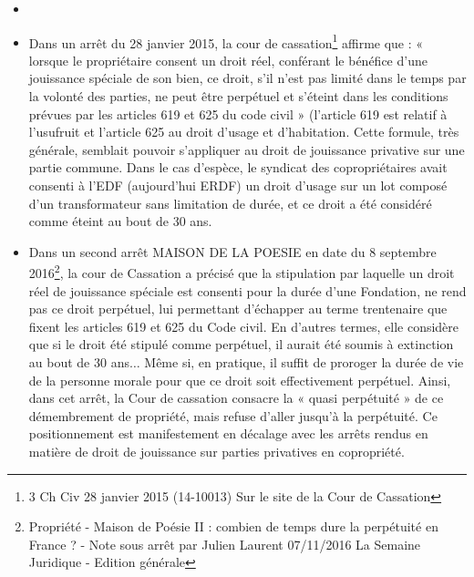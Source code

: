 			\begin{itemize}
				\item \item Dans un arrêt du 28 janvier 2015, la cour de cassation\footnote{3\degre{} Ch Civ 28 janvier 2015 (14-10013) Sur le site de la Cour de Cassation} affirme que : « lorsque le propriétaire
				consent un droit réel, conférant le bénéfice d’une jouissance spéciale de son bien, ce droit, s’il n’est pas limité
				dans le temps par la volonté des parties, ne peut être perpétuel et s’éteint dans les conditions prévues par
				les articles 619 et 625 du code civil » (l’article 619 est relatif à l’usufruit et l’article 625 au droit d’usage
				et d’habitation. Cette formule, très générale, semblait pouvoir s’appliquer au droit de jouissance
				privative sur une partie commune. Dans le cas d’espèce, le syndicat des copropriétaires avait
				consenti à l’EDF (aujourd’hui ERDF) un droit d’usage sur un lot composé d’un transformateur sans
				limitation de durée, et ce droit a été considéré comme éteint au bout de 30 ans.
				
				\item Dans un second arrêt MAISON DE LA POESIE en date du 8 septembre 2016\footnote{Propriété - Maison de Poésie II : combien de temps dure la perpétuité en France ? - Note sous arrêt par Julien Laurent 07/11/2016	La Semaine Juridique - Edition générale}, la cour de Cassation	a précisé que la stipulation par laquelle un droit réel de jouissance spéciale est consenti pour la	durée d'une Fondation, ne rend pas ce droit perpétuel, lui permettant d'échapper au terme
				trentenaire que fixent les articles 619 et 625 du Code civil. En d’autres termes, elle considère que
				si le droit été stipulé comme perpétuel, il aurait été soumis à extinction au bout de 30 ans$\dots$ Même
				si, en pratique, il suffit de proroger la durée de vie de la personne morale pour que ce droit soit
				effectivement perpétuel. Ainsi, dans cet arrêt, la Cour de cassation consacre la « quasi perpétuité »
				de ce démembrement de propriété, mais refuse d’aller jusqu’à la perpétuité. Ce positionnement
				est manifestement en décalage avec les arrêts rendus en matière de droit de jouissance sur parties
				privatives en copropriété.
				

\end{itemize}
